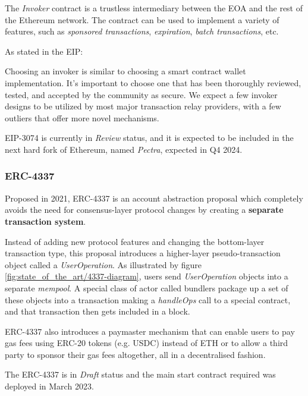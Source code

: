 The \textit{Invoker} contract is a trustless intermediary between the EOA and the rest of the Ethereum network. The contract can be used to implement a variety of features, such as \textit{sponsored transactions}, \textit{expiration}, \textit{batch transactions}, etc. \cite{eip-3074}

As stated in the EIP: \cite{eip-3074}
\begin{displayquote}
    Choosing an invoker is similar to choosing a smart contract wallet implementation. It's important to choose one that has been thoroughly reviewed, tested, and accepted by the community as secure. We expect a few invoker designs to be utilized by most major transaction relay providers, with a few outliers that offer more novel mechanisms.
\end{displayquote}

EIP-3074 is currently in \textit{Review} status, and it is expected to be included in the next hard fork of Ethereum, named \textit{Pectra}, expected in Q4 2024. \cite{pectra-hardfork}

\subsubsection{ERC-4337}
\label{subsubsec:erc-4337}

Proposed in 2021, ERC-4337 is an account abstraction proposal which completely avoids the need for consensus-layer protocol changes by creating a \textbf{separate transaction system}. \cite{eip-4337}

Instead of adding new protocol features and changing the bottom-layer transaction type, this proposal introduces a higher-layer pseudo-transaction object called a \textit{UserOperation}. 
As illustrated by figure \ref{fig:state_of_the_art/4337-diagram}, users send \textit{UserOperation} objects into a separate \textit{mempool}. A special class of actor called bundlers package up a set of these objects into a transaction making a \textit{handleOps} call to a special contract, and that transaction then gets included in a block. 


ERC-4337 also introduces a paymaster mechanism that can enable users to pay gas fees using ERC-20 tokens (e.g. USDC) instead of ETH or to allow a third party to sponsor their gas fees altogether, all in a decentralised fashion. \cite{isin-aa-user-experience}

The ERC-4337 is in \textit{Draft} status and the main start contract required was deployed in March 2023. \cite{ethereum-roadmap-ux}

